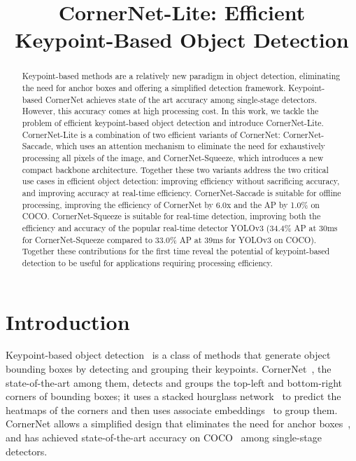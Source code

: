 \documentclass{bmvc2k}
\title{CornerNet-Lite: Efficient Keypoint-Based Object Detection}
\begin{document}
\maketitle

\begin{abstract}
Keypoint-based methods are a relatively new paradigm in object detection, eliminating the need for anchor boxes and offering a simplified detection framework. Keypoint-based CornerNet achieves state of the art accuracy among single-stage detectors. However, this accuracy comes at high processing cost. In this work, we tackle the problem of efficient keypoint-based object detection and introduce CornerNet-Lite. CornerNet-Lite is a combination of two efficient variants of CornerNet: CornerNet-Saccade, which uses an attention mechanism to eliminate the need for exhaustively processing all pixels of the image, and CornerNet-Squeeze, which introduces a new compact backbone architecture. Together these two variants address the two critical use cases in efficient object detection: improving efficiency without sacrificing accuracy, and improving accuracy at real-time efficiency. CornerNet-Saccade is suitable for offline processing, improving the efficiency of CornerNet by 6.0x and the AP by 1.0\% on COCO. CornerNet-Squeeze is suitable for real-time detection, improving both the efficiency and accuracy of the popular real-time detector YOLOv3 (34.4\% AP at 30ms for CornerNet-Squeeze compared to 33.0\% AP at 39ms for YOLOv3 on COCO). Together these contributions for the first time reveal the potential of keypoint-based detection to be useful for applications requiring processing efficiency.  
\end{abstract}

\section{Introduction}
\label{sec:introduction}

Keypoint-based object detection~\cite{tychsen2017denet,wang2017point,law2018cornernet} is a class of methods that generate object bounding boxes by detecting and grouping their keypoints. CornerNet~\cite{law2018cornernet}, the state-of-the-art among them, detects and groups the top-left and bottom-right corners of bounding boxes; it uses a stacked hourglass network~\cite{newell2016stacked} to predict the heatmaps of the corners and then uses associate embeddings~\cite{newell2017associative} to group them. CornerNet allows a simplified design that eliminates the need for anchor boxes~\cite{ren2015faster}, and has achieved state-of-the-art accuracy on COCO~\cite{lin2014microsoft} among single-stage detectors. 
\end{document}
